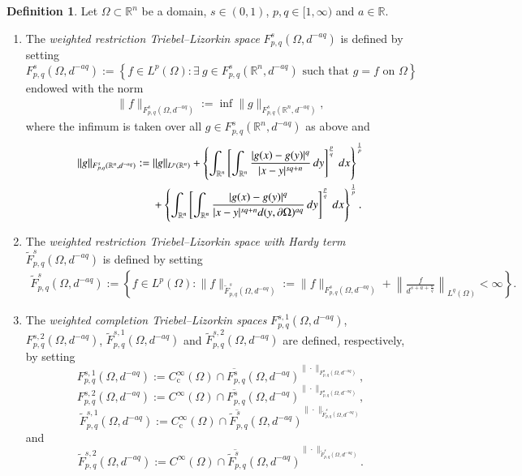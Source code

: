 \documentclass[11pt,twoside]{article}
\def\rr{{\mathbb R}}
\def\rn{{\mathbb{R}^n}}
\def\fz{\infty }
\def\boz{{\Omega}}
\def\hs{\hspace{0.25cm}}
\def\pa{\partial}                %
\theoremstyle{mylem}
\theoremstyle{definition}
\newtheorem{definition}[theorem]{Definition}
\numberwithin{equation}{section}
\begin{document}
\begin{definition}
Let $\Omega\subset\rn$ be a domain, $s\in(0,1)$,  $p,q\in[1,\fz)$ and $a\in\rr$.
\begin{enumerate}
\item[\rm(i)]The \emph{weighted restriction Triebel--Lizorkin space} $F_{p, q}^{s}(\boz,d^{-aq})$ is defined by setting
$$
F_{p, q}^{s}(\boz,d^{-aq}):=\left\{f\in L^p(\boz): \exists\ g\in F_{p,q}^s(\rn,d^{-aq}) \text{ such that }g=f\text{ on }\Omega\right\}
$$ endowed with the norm
\begin{align}\label{eqn-wrctls}
\|f\|_{F_{p, q}^{s}(\boz,d^{-aq})}:=\inf\|g\|_{F_{p,q}^s(\rn,d^{-aq})},
\end{align}
where the infimum is taken over all $g\in F_{p,q}^s(\rn,d^{-aq})$ as above and
\begin{align*}
\|g\|_{F_{p,q}^s(\rn,d^{-aq})}
&:=\|g\|_{L^p(\rn)}+ \left\{ \int_{\rn} \left[\int_{\rn} \frac{|g(x) -g(y)|^q}
{|x - y|^{s q + n}}\,dy \right]^{\frac{p}{q}}\,dx \right\}^{\frac{1}{p}} \nonumber\\ 
&\hs\hs+\left\{ \int_{\rn} \left[\int_{\rn} \frac{|g(x)-g(y)|^q}{|x - y|^{s q + n}d(y,\pa\boz)^{aq}}\,dy \right]^{\frac{p}{q}}\,dx \right\}^{\frac{1}{p}}.
\end{align*}

\item[\rm(ii)]
The \emph{weighted restriction Triebel--Lizorkin space with Hardy term} $\widetilde{F}_{p, q}^{s}(\boz,d^{-aq})$ is defined by setting
\begin{align*}
\widetilde{F}_{p, q}^{s}(\boz,d^{-aq}):=\left\{
f\in L^p(\boz):
\|f\|_{\widetilde{F}_{p, q}^{s}(\boz,d^{-aq})}:=\|f\|_{F_{p, q}^{s}(\boz,d^{-aq})}
+\left\|\frac{f}{d^{s+a+\frac{n}{q}}}\right\|_{L^q(\Omega)}<\infty\right\}.
\end{align*}

\item[\rm(iii)]
The \emph{weighted completion Triebel--Lizorkin spaces} 
$F_{p,q}^{s,1}(\boz,d^{-aq})$, $F_{p,q}^{s,2}(\boz,d^{-aq})$,
$\widetilde{F}_{p,q}^{s,1}(\boz,d^{-aq})$ and
$\widetilde{F}_{p,q}^{s,2}(\boz,d^{-aq})$ are defined, respectively, by setting $$F_{p,q}^{s,1}
(\boz,d^{-aq}):=\overline{C_{\mathrm{c}}^{\fz}(\boz)\cap F_{p, q}^{s}(\boz,d^{-aq})}^{\|\cdot\|_{F_{p,q}^s(\boz,d^{-aq})}},$$ 
$$F_{p,q}^{s,2}(\boz,d^{-aq}):=\overline{C^\infty(\boz)\cap F_{p, q}^{s}(\boz,d^{-aq})}^{\|\cdot\|_{F_{p,q}^s(\boz,d^{-aq})}},$$
$$\widetilde{F}_{p,q}^{s,1}
(\boz,d^{-aq}):=\overline{C_{\mathrm{c}}^{\fz}(\boz)\cap\widetilde{F}_{p, q}^{s}(\boz,d^{-aq})}^{\|\cdot\|_{\widetilde{F}_{p,q}^s(\boz,d^{-aq})}}$$
and 
$$\widetilde{F}_{p,q}^{s,2}(\boz,d^{-aq}):=\overline{C^\infty(\boz)\cap\widetilde{F}_{p, q}^{s}(\boz,d^{-aq})}^{\|\cdot\|_{\widetilde{F}_{p,q}^s(\boz,d^{-aq})}}.$$
\end{enumerate}
\end{definition}
\end{document}
